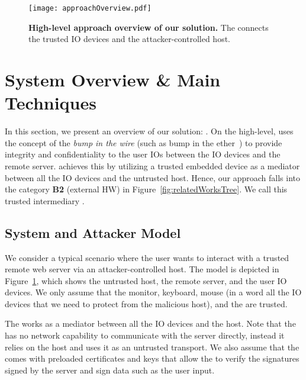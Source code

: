 \begin{figure}[t]
\centering
\texttt{[image: approachOverview.pdf]}
\caption{\textbf{High-level approach overview of our solution.}  The \device connects the trusted IO devices and the attacker-controlled host. 
}
\spacesave
\label{fig:approachOverview}
\centering
\end{figure}

\section{System Overview \& Main Techniques}
\label{sec:approach}

In this section, we present an overview of our solution: \name. On the high-level, \name uses the concept of the \emph{bump in the wire} (such as bump in the ether~\cite{McCPerRei2006}) to provide integrity and confidentiality to the user IO{}s between the IO devices and the remote server. \name achieves this by utilizing a trusted embedded device as a mediator between all the IO devices and the untrusted host. Hence, our approach falls into the category \textbf{B2} (external HW) in Figure~\ref{fig:relatedWorksTree}. 
We call this trusted intermediary \device. 


\subsection{System and Attacker Model}
\label{sec:approach:systemAttackerModel}

We consider a typical scenario where the user wants to interact with a trusted remote web server via an attacker-controlled host. The model is depicted in Figure~\ref{fig:approachOverview}, which shows the untrusted host, the remote server, and the user IO devices. We only assume that the monitor, keyboard, mouse (in a word all the IO devices that we need to protect from the malicious host), and the \device are trusted. 

The \device works as a mediator between all the IO devices and the host. Note that the \device has no network capability to communicate with the server directly, instead it relies on the host and uses it as an untrusted transport. We also assume that the \device comes with preloaded certificates and keys that allow the \device to verify the signatures signed by the server and sign data such as the user input.

